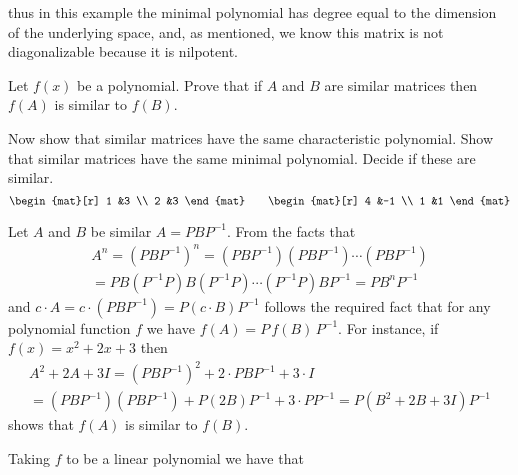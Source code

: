 \begin{exercises}
\begin{answer}
      thus in this example the minimal polynomial has degree equal to the 
      dimension of the underlying space, and, as mentioned,
      we know this matrix is not diagonalizable because it is nilpotent. 
    \end{answer}
   \item 
     Let $f(x)$ be a polynomial.
     Prove that if $A$ and $B$ are similar matrices then $f(A)$ is 
     similar to $f(B)$.
     \begin{exparts}
       \partsitem Now show that similar matrices have the same characteristic
         polynomial.
       \partsitem Show that similar matrices have the same minimal polynomial.
       \partsitem Decide if these are similar.
          \begin{equation*}
            \begin{mat}[r]
              1  &3  \\
              2  &3
            \end{mat}
            \qquad
            \begin{mat}[r]
              4  &-1 \\
              1  &1
            \end{mat}
          \end{equation*}
     \end{exparts}
     \begin{answer}
       Let \( A \) and \( B \) be similar \( A=PBP^{-1} \).
       From the facts that 
       \begin{multline*}
           A^n=(PBP^{-1})^n=(PBP^{-1})(PBP^{-1})\cdots(PBP^{-1})   \\
                           =PB(P^{-1}P)B(P^{-1}P)\cdots (P^{-1}P)BP^{-1}
                           =PB^nP^{-1}
       \end{multline*}
       and $c\cdot A=c\cdot(PBP^{-1})=P(c\cdot B)P^{-1}$ follows 
       the required fact that for any polynomial function $f$ we have 
       \( f(A)=P\,f(B)\,P^{-1} \).
       For instance, if $f(x)=x^2+2x+3$ then
       \begin{multline*}
         A^2+2A+3I=(PBP^{-1})^2+2\cdot PBP^{-1}+3\cdot I           \\
                  =(PBP^{-1})(PBP^{-1})+P(2B)P^{-1}+3\cdot PP^{-1}
                  =P(B^2+2B+3I)P^{-1}
       \end{multline*}
       shows that $f(A)$ is similar to $f(B)$.
       \begin{exparts}
         \partsitem Taking $f$ to be a linear polynomial we have that

\end{exparts}
\end{answer}
\end{exercises}
